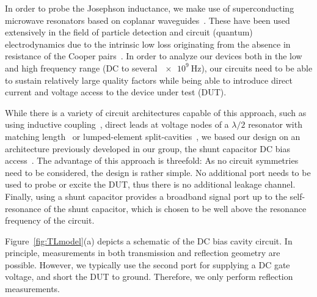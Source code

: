 

In order to probe the Josephson inductance, we make use of superconducting microwave resonators based on coplanar waveguides~\cite{gopplCoplanarWaveguideResonators2008,zmuidzinasSuperconductingMicroresonatorsPhysics2012}.
%
These have been used extensively in the field of particle detection and circuit (quantum) electrodynamics due to the intrinsic low loss originating from the absence in resistance of the Cooper pairs~\cite{dayBroadbandSuperconductingDetector2003a,blaisCavityQuantumElectrodynamics2004c}.
%
In order to analyze our devices both in the low and high frequency range (DC to several $\SI{e9}{\hertz}$), our circuits need to be able to sustain relatively large quality factors while being able to introduce direct current and voltage access to the device under test (DUT).

While there is a variety of circuit architectures capable of this approach, such as using inductive coupling~\cite{vissersFrequencytunableSuperconductingResonators2015b}, direct leads at voltage nodes of a $\lambda/2$ resonator with matching length~\cite{chenIntroductionDcBias2011a,liApplyingDirectCurrent2013} or lumped-element split-cavities~\cite{mahashabdeFastTunableHigh2020}, we based our design on an architecture previously developed in our group, the shunt capacitor DC bias access~\cite{bosmanBroadbandArchitectureGalvanically2015c}.
%
The advantage of this approach is threefold:
%
As no circuit symmetries need to be considered, the design is rather simple.
%
No additional port needs to be used to probe or excite the DUT, thus there is no additional leakage channel.
%
Finally, using a shunt capacitor provides a broadband signal port up to the self-resonance of the shunt capacitor, which is chosen to be well above the resonance frequency of the circuit.

Figure~\ref{fig:TLmodel}(a) depicts a schematic of the DC bias cavity circuit.
%
In principle, measurements in both transmission and reflection geometry are possible.
%
However, we typically use the second port for supplying a DC gate voltage, and short the DUT to ground.
%
Therefore, we only perform reflection measurements.

